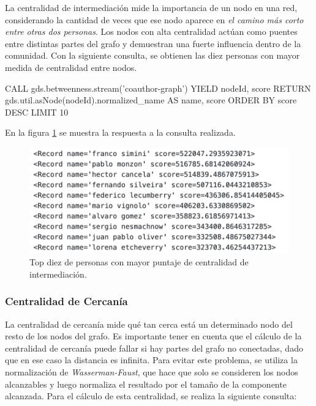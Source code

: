 \documentclass[journal]{IEEEtran}
\begin{document}
La centralidad de intermediación mide la importancia de un nodo en una red, considerando la cantidad de veces que ese nodo aparece en \textit{el camino más corto entre otras dos personas}. Los nodos con alta centralidad actúan como puentes entre distintas partes del grafo y demuestran una fuerte influencia dentro de la comunidad. Con la siguiente consulta, se obtienen las diez personas con mayor medida de centralidad entre nodos.

\begin{sflisting}[style=sparql,caption= Centralidad de Intermediación,label=intermediacion]
	CALL gds.betweenness.stream('coauthor-graph')
	YIELD nodeId, score
	RETURN gds.util.asNode(nodeId).normalized_name
	AS name, score
	ORDER BY score DESC
	LIMIT 10
\end{sflisting}

En la figura \ref{fig:intermediacion} se muestra la respuesta a la consulta realizada.

\begin{figure}[htb]
	\centering
	\includegraphics[width=\linewidth]{imagenes/intermediacion.png}
	\caption{Top diez de personas con mayor puntaje de centralidad de intermediación.}
	\label{fig:intermediacion}
\end{figure}

\subsubsection{Centralidad de Cercanía}
La centralidad de cercanía mide qué tan cerca está un determinado nodo del resto de los nodos del grafo. Es importante tener en cuenta que el cálculo de la centralidad de cercanía puede fallar si hay partes del grafo no conectadas, dado que en ese caso la distancia es infinita. Para evitar este problema, se utiliza la normalización de \textit{Wasserman-Faust}, que hace que solo se consideren los nodos alcanzables y luego normaliza el resultado por el tamaño de la componente alcanzada. Para el cálculo de esta centralidad, se realiza la siguiente consulta:
\end{document}
